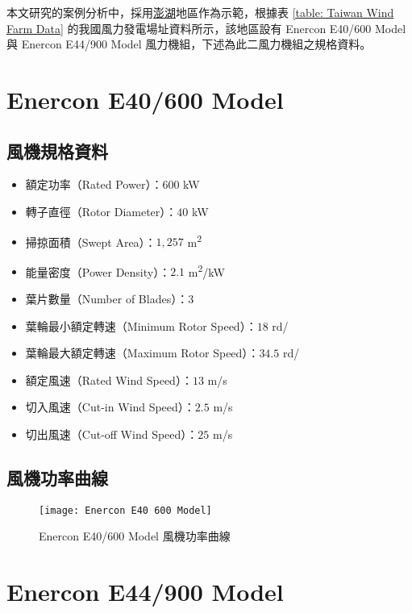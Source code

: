 

本文研究的案例分析中，採用\uline{澎湖}地區作為示範，根據表 \ref{table: Taiwan Wind Farm Data} 的我國風力發電場址資料所示，該地區設有 Enercon E40/600 Model 與 Enercon E44/900 Model 風力機組，下述為此二風力機組之規格資料。

\section{Enercon E40/600 Model}

\subsection*{風機規格資料}

\begin{itemize}
  \item 額定功率（Rated Power）：$600$ \si{\kW}
  \item 轉子直徑（Rotor Diameter）：$40$ \si{\kW}
  \item 掃掠面積（Swept Area）：$1,257$ \si{\meter\squared}
  \item 能量密度（Power Density）：$2.1$ \si{\meter\squared}/\si{\kW}
  \item 葉片數量（Number of Blades）：$3$
  \item 葉輪最小額定轉速（Minimum Rotor Speed）：$18$ \si{rd}/\si{\min}
  \item 葉輪最大額定轉速（Maximum Rotor Speed）：$34.5$ \si{rd}/\si{\min}
  \item 額定風速（Rated Wind Speed）：$13$ \si{m}/\si{s}
  \item 切入風速（Cut-in Wind Speed）：$2.5$ \si{m}/\si{s}
  \item 切出風速（Cut-off Wind Speed）：$25$ \si{m}/\si{s}
\end{itemize}

\subsection*{風機功率曲線}

\begin{figure}[htbp]
  \centering
  \texttt{[image: Enercon E40 600 Model]}
  \caption{Enercon E40/600 Model 風機功率曲線}
  \label{figure: Enercon E40/600 Model}
\end{figure}

\section{Enercon E44/900 Model}

